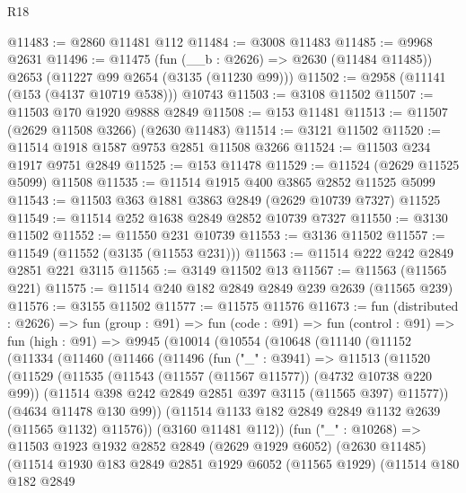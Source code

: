 \begin{lexlean}{R18}
\begin{coremodule}
@11483 := @2860 @11481 @112
@11484 := @3008 @11483
@11485 := @9968 @2631
@11496 := @11475
    (fun (__b : @2626) => @2630 (@11484 @11485))
    @2653
    (@11227 @99 @2654 (@3135 (@11230 @99)))
@11502 := @2958 (@11141 (@153 (@4137 @10719 @538))) @10743
@11503 := @3108 @11502
@11507 := @11503 @170 @1920 @9888 @2849
@11508 := @153 @11481
@11513 := @11507 (@2629 @11508 @3266) (@2630 @11483)
@11514 := @3121 @11502
@11520 := @11514 @1918 @1587 @9753 @2851 @11508 @3266
@11524 := @11503 @234 @1917 @9751 @2849
@11525 := @153 @11478
@11529 := @11524 (@2629 @11525 @5099) @11508
@11535 := @11514 @1915 @400 @3865 @2852 @11525 @5099
@11543 := @11503 @363 @1881 @3863 @2849 (@2629 @10739 @7327) @11525
@11549 := @11514 @252 @1638 @2849 @2852 @10739 @7327
@11550 := @3130 @11502
@11552 := @11550 @231 @10739
@11553 := @3136 @11502
@11557 := @11549 (@11552 (@3135 (@11553 @231)))
@11563 := @11514 @222 @242 @2849 @2851 @221 @3115
@11565 := @3149 @11502 @13
@11567 := @11563 (@11565 @221)
@11575 := @11514 @240 @182 @2849 @2849 @239 @2639 (@11565 @239)
@11576 := @3155 @11502
@11577 := @11575 @11576
@11673 := fun (distributed : @2626) =>
  fun (group : @91) =>
  fun (code : @91) =>
  fun (control : @91) =>
  fun (high : @91) =>
  @9945
    (@10014
      (@10554
        (@10648
          (@11140
            (@11152
              (@11334
                (@11460
                  (@11466
                    (@11496
                      (fun ("_" : @3941) =>
                      @11513
                        (@11520
                          (@11529
                            (@11535
                              (@11543 (@11557 (@11567 @11577)) (@4732 @10738 @220 @99))
                              (@11514 @398 @242 @2849 @2851 @397 @3115 (@11565 @397) @11577))
                            (@4634 @11478 @130 @99))
                          (@11514 @1133 @182 @2849 @2849 @1132 @2639 (@11565 @1132) @11576))
                        (@3160 @11481 @112))
                      (fun ("_" : @10268) =>
                      @11503
                        @1923
                        @1932
                        @2852
                        @2849
                        (@2629 @1929 @6052)
                        (@2630 @11485)
                        (@11514
                          @1930
                          @183
                          @2849
                          @2851
                          @1929
                          @6052
                          (@11565 @1929)
                          (@11514
                            @180
                            @182
                            @2849

\end{coremodule}
\end{lexlean}
